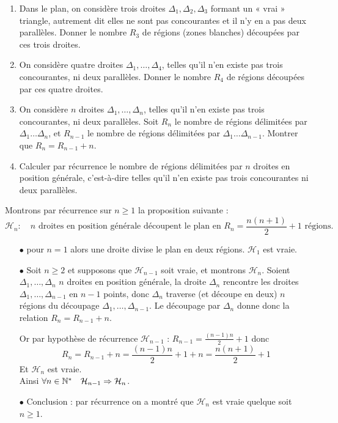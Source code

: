 \begin{exo}

\begin{enumerate}
\item
Dans le plan, on consid\`ere trois droites $\Delta_{1},\Delta_{2},\Delta_{3}$ formant un
« vrai » triangle, autrement dit elles ne sont pas concourantes et il n'y en a pas deux parall\`eles.
Donner le nombre $R_{3}$ de r\'egions (zones blanches) d\'ecoup\'ees par ces trois droites.
\item
On consid\`ere quatre droites $\Delta_{1},\ldots,\Delta_{4}$, telles qu'il n'en existe pas
trois concourantes, ni deux parall\`eles. Donner le nombre $R_{4}$ de r\'egions d\'ecoup\'ees par
ces quatre droites.
\item
On consid\`ere $n$ droites $\Delta_{1},\ldots,\Delta_{n}$, telles qu'il n'en existe pas
trois concourantes, ni deux parall\`eles. Soit $R_{n}$ le nombre de r\'egions d\'elimit\'ees par
$\Delta_{1}\ldots\Delta_{n}$, et $R_{n-1}$ le nombre de r\'egions d\'elimit\'ees par
$\Delta_{1}\ldots\Delta_{n-1}$. Montrer que $R_{n}=R_{n-1}+n$.
\item
Calculer par r\'ecurrence le nombre de r\'egions d\'elimit\'ees par $n$ droites en position
g\'en\'erale, c'est-\`a-dire telles qu'il n'en existe pas trois concourantes ni deux parall\`eles.
\end{enumerate}

\begin{sol}
Montrons par r\'ecurrence sur $n \geqslant 1$ la proposition suivante :
$$\mathcal{H}_n :  \quad n \text{\  droites en position g\'en\'erale d\'ecoupent le plan en \ } R_n = \frac{n(n+1)}{2}+1
\text{\  r\'egions.}$$

\begin{itemize}
\item[$\bullet$] pour $n=1$ alors une droite divise le plan en deux r\'egions. $\mathcal{H}_1$ est vraie.

\item[$\bullet$] Soit $n\geqslant 2$ et supposons que $\mathcal{H}_{n-1}$ soit vraie, et montrons $\mathcal{H}_n$.
Soient $\Delta_1,\ldots,\Delta_n$ $n$ droites en position
g\'en\'erale, la droite $\Delta_n$ rencontre les droites
$\Delta_1,\ldots,\Delta_{n-1}$ en $n-1$ points, donc $\Delta_n$
traverse (et d\'ecoupe en deux) $n$ r\'egions du d\'ecoupage
$\Delta_1,\ldots,\Delta_{n-1}$. Le d\'ecoupage par $\Delta_n$
donne donc la relation $R_n=R_{n-1}+n$.

Or par hypoth\`ese de r\'ecurrence $\mathcal{H}_{n-1}$ : $R_{n-1}
= \frac{(n-1)n}{2}+1$ donc
$$  R_n = R_{n-1}+n =  \frac{(n-1)n}{2}+1+n=\frac{n(n+1)}{2}+1 $$
Et $\mathcal{H}_n$ est vraie.\\
Ainsi $\forall n\in\mathbb N^* \quad \mathcal{H}_{n-1}\Rightarrow
\mathcal{H}_{n}$.

\item[$\bullet$] Conclusion :  par r\'ecurrence on a montr\'e que $\mathcal{H}_n$ est vraie quelque soit $n \geqslant 1$.

\end{itemize}
\end{sol}
\end{exo}
